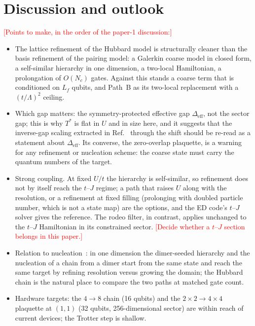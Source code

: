 \documentclass[
  aps,
  prc,
  reprint,
  superscriptaddress,
  floatfix,
  nofootinbib
]{revtex4-2}
\newcommand{\todo}[1]{\textcolor{red}{[#1]}}
\newcommand{\Deff}{\Delta_{\mathrm{eff}}}
\begin{document}
\section{Discussion and outlook}
\label{sec:discussion}
\todo{Points to make, in the order of the paper-1 discussion:}
\begin{itemize}
  \item The lattice refinement of the Hubbard model is structurally cleaner
  than the basis refinement of the pairing model: a Galerkin coarse model in
  closed form, a self-similar hierarchy in one dimension, a two-local
  Hamiltonian, a prolongation of $O(N_c)$ gates.  Against this stands a
  coarse term that is conditioned on $L_f$ qubits, and Path~B as its
  two-local replacement with a $(t/\Lambda)^2$ ceiling.
  \item Which gap matters: the symmetry-protected effective gap $\Deff$,
  not the sector gap; this is why $T^*$ is flat in $U$ and in size here,
  and it suggests that the inverse-gap scaling extracted in
  Ref.~\cite{EigenQPairing2026} through the shift should be re-read as a
  statement about $\Deff$.  Its converse, the zero-overlap plaquette, is a
  warning for any refinement or nucleation scheme: the coarse state must
  carry the quantum numbers of the target.
  \item Strong coupling.  At fixed $U/t$ the hierarchy is self-similar, so
  refinement does not by itself reach the $t$--$J$ regime; a path that
  raises $U$ along with the resolution, or a refinement at fixed filling
  (prolonging with doubled particle number, which is not a state map) are
  the options, and the ED code's $t$--$J$ solver gives the reference.  The
  rodeo filter, in contrast, applies unchanged to the $t$--$J$ Hamiltonian
  in its constrained sector.  \todo{Decide whether a $t$--$J$ section
  belongs in this paper.}
  \item Relation to nucleation~\cite{Sadia2026}: in one dimension the
  dimer-seeded hierarchy and the nucleation of a chain from a dimer start
  from the same state and reach the same target by refining resolution
  versus growing the domain; the Hubbard chain is the natural place to
  compare the two paths at matched gate count.
  \item Hardware targets: the $4\to8$ chain (16 qubits) and the
  $2\times2\to4\times4$ plaquette at $(1,1)$ (32 qubits, 256-dimensional
  sector) are within reach of current devices; the Trotter step is shallow.
\end{itemize}
\end{document}
